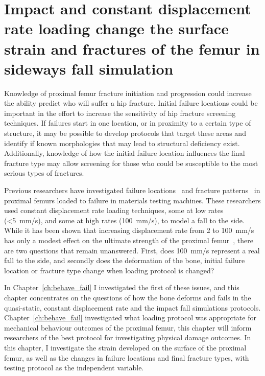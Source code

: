 
\chapter{Impact and constant displacement rate loading change the surface strain and fractures of the femur in sideways fall simulation}
\label{ch:fracture}
Knowledge of proximal femur fracture initiation and progression could increase the ability predict who will suffer a hip fracture.
Initial failure locations could be important in the effort to increase the sensitivity of hip fracture screening techniques.
If failures start in one location, or in proximity to a certain type of structure, it may be possible to develop protocols that target these areas and identify if known morphologies that may lead to structural deficiency exist.
Additionally, knowledge of how the initial failure location influences the final fracture type may allow screening for those who could be susceptible to the most serious types of fractures.

Previous researchers have investigated failure locations~\citep{de_bakker_during_2009} and fracture patterns~\citep{backman_proximal_1957, lotz_use_1990, weber_proximal_1992, courtney_effects_1994, pinilla_impact_1996, keyak_prediction_2001, lochmuller_mechanical_2002, bell_structure_1999} in proximal femurs loaded to failure in materials testing machines.
These researchers used constant displacement rate loading techniques, some at low rates (\textless5~\ac{mm}/\ac{s}), and some at high rates (100~\ac{mm}/\ac{s}), to model a fall to the side.
While it has been shown that increasing displacement rate from 2 to 100~\ac{mm}/\ac{s} has only a modest effect on the ultimate strength of the proximal femur~\citep{courtney_effects_1994}, there are two questions that remain unanswered.
First, does 100~\ac{mm}/\ac{s} represent a real fall to the side, and secondly does the deformation of the bone, initial failure location or fracture type change when loading protocol is changed?

In Chapter~\ref{ch:behave_fail} I investigated the first of these issues, and this chapter concentrates on the questions of how the bone deforms and fails in the quasi-static, constant displacement rate and the impact fall simulations protocols.
Chapter~\ref{ch:behave_fail} investigated what loading protocol was appropriate for mechanical behaviour outcomes of the proximal femur, this chapter will inform researchers of the best protocol for investigating physical damage outcomes.
In this chapter, I investigate the strain developed on the surface of the proximal femur, as well as the changes in failure locations and final fracture types, with testing protocol as the independent variable.

